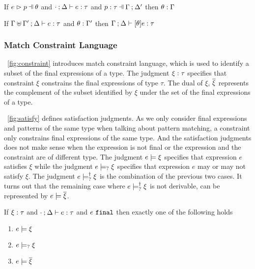 \documentclass[runningheads,envcountsame,a4paper]{llncs}
\begin{document}
\begin{lemma}
  \label{lem:subs-typing}
  If $\hpatmatch{e}{p}{\theta}$ and $\cdot \mathbin{;} \Delta \vdash e : \tau$ and $\hpattyp{p}{\tau}{\Gamma}{\Delta'}$
  then $\theta : \Gamma$
\end{lemma}

\begin{lemma}
  \label{lem:simult-substitution}
  If $\Gamma \uplus \Gamma' \mathbin{;} \Delta \vdash e : \tau$ and $\theta : \Gamma'$
  then $\Gamma \mathbin{;} \Delta \vdash [\theta]e : \tau$
\end{lemma}

\subsubsection{Match Constraint Language}\label{sec:constraint}


\figurename~\ref{fig:constraint} introduces match constraint language, which is
used to identify a subset of the final expressions of a type. The judgment
$\xi : \tau$ specifies that constraint $\xi$ constrains the final
expressions of type $\tau$. The dual of $\xi$, $\overline{\xi}$ represents the
complement of the subset identified by $\xi$ under the set of the final
expressions of a type.



\figurename~\ref{fig:satisfy} defines satisfaction judgments. As we only
consider final expressions and patterns of the same type when talking about
pattern matching, a constraint only constrains final expressions of the same
type. And the satisfaction judgments does not make sense when the expression is
not final or the expression and the constraint are of different type. The
judgment $e \models \xi$ specifies that expression $e$ satisfies $\xi$ while
the judgment $e \models_{?} \xi$ specifies that expression $e$ may or may not
satisfy $\xi$. The judgment $e \models_{?}^{\dag} \xi$ is the combination of the
previous two cases. It turns out that the remaining case where
$e \models_{?}^{\dag} \xi$ is not derivable, can be represented by
$e \models \overline{\xi}$.

\begin{theorem}
  \label{thrm:exclusive-constraint-satisfaction}
  If $\xi : \tau$ and $\cdot \mathbin{;} \Delta \vdash e : \tau$ and $e ~\mathtt{final}$ then exactly one of the following holds
  \begin{enumerate}
  \item $e \models \xi$
  \item $e \models_{?} \xi$
  \item $e \models \overline{\xi}$
  \end{enumerate}
\end{theorem}
\end{document}
